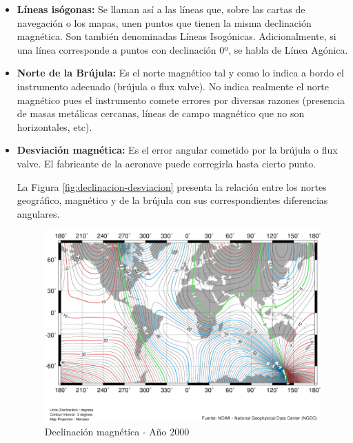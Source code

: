 \begin{itemize}
\item \textbf{Líneas isógonas:} Se llaman así a las líneas que, sobre las cartas de navegación o los mapas, unen puntos que tienen la misma declinación magnética. Son también denominadas Líneas Isogónicas. Adicionalmente, si una línea corresponde a puntos con declinación 0º, se habla de Línea Agónica. 

\item \textbf{Norte de la Brújula:} Es el norte magnético tal y como lo indica a bordo el instrumento adecuado (brújula o flux valve). No indica realmente el norte magnético pues el instrumento comete errores por diversas razones (presencia de masas metálicas cercanas, líneas de campo magnético que no son horizontales, etc).

\item \textbf{Desviación magnética:} Es el error angular cometido por la brújula o flux valve. El fabricante de la aeronave puede corregirla hasta cierto punto.

La Figura \ref{fig:declinacion-desviacion} presenta la relación entre los nortes geográfico, magnético y de la brújula con sus correspondientes diferencias angulares.

\begin{figure}[!htb]
    \centering
\includegraphics[keepaspectratio,width=\textwidth]{./Imagenes/06.00.navegacion/declinacion-magnetica-anio-2000.png}
\caption{Declinaci\'on magn\'etica - A\~no 2000 \cite{Salazar_nav_aerea}}
\label{fig:declinacion-magnetica-anio-2000}
\end{figure}


\end{itemize}
